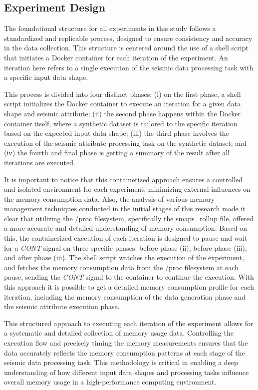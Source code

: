 \subsection{Experiment Design}
\label{subsec:experiment-design}

The foundational structure for all experiments in this study follows a standardized and replicable process, designed to ensure consistency and accuracy in the data collection.
This structure is centered around the use of a shell script that initiates a Docker container for each iteration of the experiment.
An iteration here refers to a single execution of the seismic data processing task with a specific input data shape.

This process is divided into four distinct phases:
(i) on the first phase, a shell script initializes the Docker container to execute an iteration for a given data shape and seismic attribute;
(ii) the second phase happens within the Docker container itself, where a synthetic dataset is tailored to the specific iteration based on the expected input data shape;
(iii) the third phase involves the execution of the seismic attribute processing task on the synthetic dataset; and
(iv) the fourth and final phase is getting a summary of the result after all iterations are executed.

It is important to notice that this containerized approach ensures a controlled and isolated environment for each experiment, minimizing external influences on the memory consumption data.
Also, the analysis of various memory management techniques conducted in the initial stages of this research made it clear that utilizing the /proc filesystem, specifically the smaps\_rollup file, offered a more accurate and detailed understanding of memory consumption.
Based on this, the containerized execution of each iteration is designed to pause and wait for a \textit{CONT} signal on three specific phases: before phase (ii), before phase (iii), and after phase (iii).
The shell script watches the execution of the experiment, and fetches the memory consumption data from the /proc filesystem at each pause, sending the \textit{CONT} signal to the container to continue the execution.
With this approach it is possible to get a detailed memory consumption profile for each iteration, including the memory consumption of the data generation phase and the seismic attribute execution phase.

This structured approach to executing each iteration of the experiment allows for a systematic and detailed collection of memory usage data.
Controlling the execution flow and precisely timing the memory measurements ensures that the data accurately reflects the memory consumption patterns at each stage of the seismic data processing task.
This methodology is critical in enabling a deep understanding of how different input data shapes and processing tasks influence overall memory usage in a high-performance computing environment.

